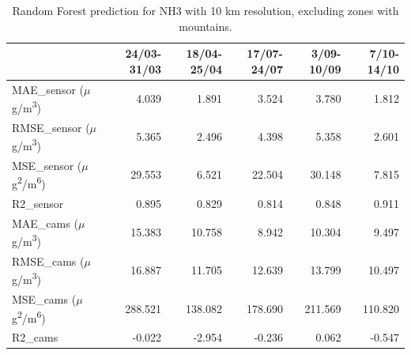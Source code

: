 \begin{table}[H]
\begin{tabular}{lrrrrr}
\toprule
 &  24/03-31/03 &  18/04-25/04 &  17/07-24/07 &  3/09-10/09 &  7/10-14/10 \\
\midrule
 MAE\_sensor ($\mu$g/m\textsuperscript{3})&        4.039 &        1.891 &        3.524 &       3.780 &       1.812 \\
RMSE\_sensor ($\mu$g/m\textsuperscript{3})&        5.365 &        2.496 &        4.398 &       5.358 &       2.601 \\
 MSE\_sensor ($\mu$g\textsuperscript{2}/m\textsuperscript{6})&       29.553 &        6.521 &       22.504 &      30.148 &       7.815 \\
  R2\_sensor &        0.895 &        0.829 &        0.814 &       0.848 &       0.911 \\
   MAE\_cams ($\mu$g/m\textsuperscript{3})&       15.383 &       10.758 &        8.942 &      10.304 &       9.497 \\
  RMSE\_cams ($\mu$g/m\textsuperscript{3})&       16.887 &       11.705 &       12.639 &      13.799 &      10.497 \\
   MSE\_cams ($\mu$g\textsuperscript{2}/m\textsuperscript{6})&      288.521 &      138.082 &      178.690 &     211.569 &     110.820 \\
    R2\_cams &       -0.022 &       -2.954 &       -0.236 &       0.062 &      -0.547 \\
\bottomrule
\end{tabular}
\caption{Random Forest prediction for NH3 with 10 km resolution, excluding zones with mountains.}
\end{table}
